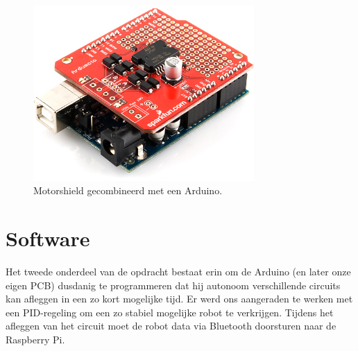 \begin{figure}[H]
\centering
\includegraphics[width=0.75\textwidth]{ArduMoto.png}
\caption{Motorshield gecombineerd met een Arduino. \label{fig:ArduMoto}}
\end{figure}

\section{Software}
Het tweede onderdeel van de opdracht bestaat erin om de Arduino (en later onze eigen PCB) dusdanig te programmeren dat hij autonoom verschillende circuits kan afleggen in een zo kort mogelijke tijd. Er werd ons aangeraden te werken met een PID-regeling om een zo stabiel mogelijke robot te verkrijgen. Tijdens het afleggen van het circuit moet de robot data via Bluetooth doorsturen naar de Raspberry Pi.


 




